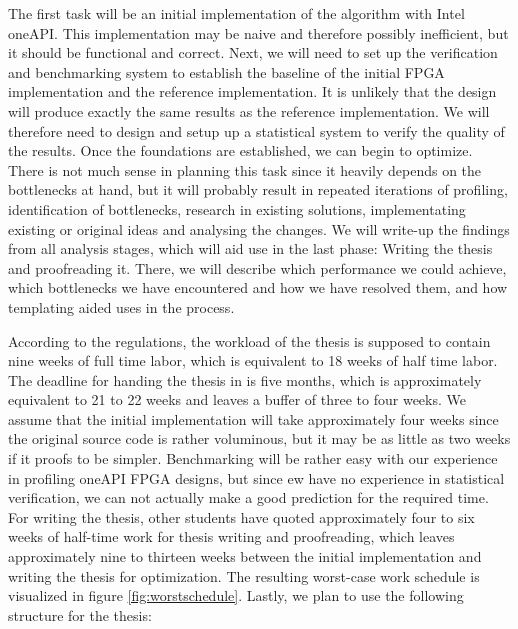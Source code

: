 The first task will be an initial implementation of the algorithm with Intel oneAPI. This implementation may be naive and therefore possibly inefficient, but it should be functional and correct. Next, we will need to set up the verification and benchmarking system to establish the baseline of the initial FPGA implementation and the reference implementation. It is unlikely that the design will produce exactly the same results as the reference implementation. We will therefore need to design and setup up a statistical system to verify the quality of the results. Once the foundations are established, we can begin to optimize. There is not much sense in planning this task since it heavily depends on the bottlenecks at hand, but it will probably result in repeated iterations of profiling, identification of bottlenecks, research in existing solutions, implementating existing or original ideas and analysing the changes. We will write-up the findings from all analysis stages, which will aid use in the last phase: Writing the thesis and proofreading it. There, we will describe which performance we could achieve, which bottlenecks we have encountered and how we have resolved them, and how templating aided uses in the process.

According to the regulations, the workload of the thesis is supposed to contain nine weeks of full time labor, which is equivalent to 18 weeks of half time labor. The deadline for handing the thesis in is five months, which is approximately equivalent to 21 to 22 weeks and leaves a buffer of three to four weeks. We assume that the initial implementation will take approximately four weeks since the original source code is rather voluminous, but it may be as little as two weeks if it proofs to be simpler. Benchmarking will be rather easy with our experience in profiling oneAPI FPGA designs, but since ew have no experience in statistical verification, we can not actually make a good prediction for the required time. For writing the thesis, other students have quoted approximately four to six weeks of half-time work for thesis writing and proofreading, which leaves approximately nine to thirteen weeks between the initial implementation and writing the thesis for optimization. The resulting worst-case work schedule is visualized in figure \ref{fig:worstschedule}. Lastly, we plan to use the following structure for the thesis:

